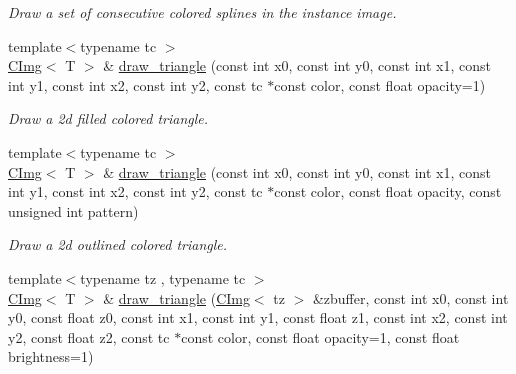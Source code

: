 \begin{DoxyCompactItemize}
\begin{DoxyCompactList}\small\item\em Draw a set of consecutive colored splines in the instance image. \item\end{DoxyCompactList}\item 
\hypertarget{structcimg__library_1_1CImg_a405d83987b7969b9942e4446b5924ec9}{
{\footnotesize template$<$typename tc $>$ }\\\hyperlink{structcimg__library_1_1CImg}{CImg}$<$ T $>$ \& \hyperlink{structcimg__library_1_1CImg_a405d83987b7969b9942e4446b5924ec9}{draw\_\-triangle} (const int x0, const int y0, const int x1, const int y1, const int x2, const int y2, const tc $\ast$const color, const float opacity=1)}
\label{structcimg__library_1_1CImg_a405d83987b7969b9942e4446b5924ec9}

\begin{DoxyCompactList}\small\item\em Draw a 2d filled colored triangle. \item\end{DoxyCompactList}\item 
\hypertarget{structcimg__library_1_1CImg_a7c3262c3f6bb593b3ae8ae1751f005b9}{
{\footnotesize template$<$typename tc $>$ }\\\hyperlink{structcimg__library_1_1CImg}{CImg}$<$ T $>$ \& \hyperlink{structcimg__library_1_1CImg_a7c3262c3f6bb593b3ae8ae1751f005b9}{draw\_\-triangle} (const int x0, const int y0, const int x1, const int y1, const int x2, const int y2, const tc $\ast$const color, const float opacity, const unsigned int pattern)}
\label{structcimg__library_1_1CImg_a7c3262c3f6bb593b3ae8ae1751f005b9}

\begin{DoxyCompactList}\small\item\em Draw a 2d outlined colored triangle. \item\end{DoxyCompactList}\item 
\hypertarget{structcimg__library_1_1CImg_a60efe9f047c08bad6a632487add3a36e}{
{\footnotesize template$<$typename tz , typename tc $>$ }\\\hyperlink{structcimg__library_1_1CImg}{CImg}$<$ T $>$ \& \hyperlink{structcimg__library_1_1CImg_a60efe9f047c08bad6a632487add3a36e}{draw\_\-triangle} (\hyperlink{structcimg__library_1_1CImg}{CImg}$<$ tz $>$ \&zbuffer, const int x0, const int y0, const float z0, const int x1, const int y1, const float z1, const int x2, const int y2, const float z2, const tc $\ast$const color, const float opacity=1, const float brightness=1)}
\label{structcimg__library_1_1CImg_a60efe9f047c08bad6a632487add3a36e}


\end{DoxyCompactItemize}
